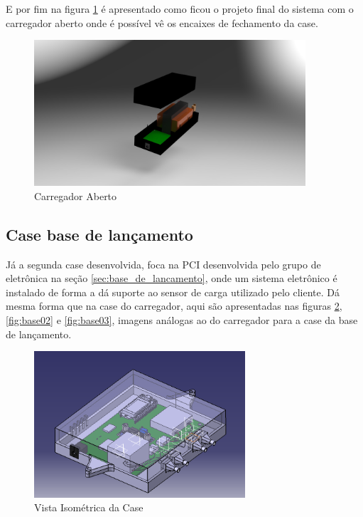 E por fim na figura \ref{fig:carregador03} é apresentado como ficou o projeto final do sistema com o carregador aberto onde é possível vê os encaixes de fechamento da case.

\begin{figure}[H]
\centering
\includegraphics[width=0.9\textwidth]{figuras/cad/untitled.8.jpg}
\caption{Carregador Aberto}
\label{fig:carregador03}
\end{figure}

\subsection{Case base de lançamento}

\par Já a segunda case desenvolvida, foca na PCI desenvolvida pelo grupo de eletrônica na seção \ref{sec:base_de_lancamento}, onde um sistema eletrônico é instalado de forma a dá suporte ao sensor de carga utilizado pelo cliente. Dá mesma forma que na case do carregador, aqui são apresentadas nas figuras \ref{fig:base01}, \ref{fig:base02} e \ref{fig:base03}, imagens análogas ao do carregador para a case da base de lançamento.

\begin{figure}[H]
\centering
\includegraphics[width=0.7\textwidth]{figuras/cad/ISOCASELET.PNG}
\caption{Vista Isométrica da Case}
\label{fig:base01}
\end{figure}

